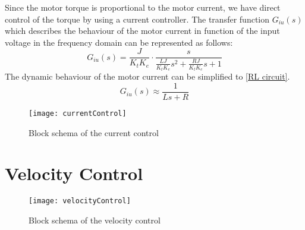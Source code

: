 \documentclass[a4paper, 11pt]{article}
\begin{document}
Since the motor torque is proportional to the motor current, we have direct control of the torque by using a current controller. The transfer function $G_{iu}(s)$ which describes the behaviour of the motor current in function of the input voltage in the frequency domain can be represented as follows:
\begin{equation}
G_{iu}(s) =  \frac{J}{K_tK_e}\cdot\frac{s}{\frac{LJ}{K_tK_e}s^2 + \frac{RJ}{K_tK_e}s + 1}
\end{equation}
The dynamic behaviour of the motor current can be simplified to \eqref{RL circuit}.
\begin{equation}
\label{RL circuit}
G_{iu}(s) \approx \frac{1}{Ls + R}
\end{equation}
\begin{figure}[H]
	\centering
	\texttt{[image: currentControl]}
	\caption{Block schema of the current control}	
	\label{fig:currentControl}	
\end{figure}
\noindent 


\newpage
\section{Velocity Control}
\begin{figure}[H]
	\centering
	\texttt{[image: velocityControl]}
	\caption{Block schema of the velocity control}	
	\label{fig:velocityControl}	
\end{figure}
\noindent 
\end{document}
